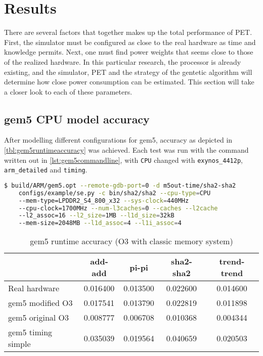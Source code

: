 \section{Results}

There are several factors that together makes up the total performance of PET. First, the simulator must be
configured as close to the real hardware as time and knowledge permits. Next, one must find power weights that
seems close to those of the realized hardware. In this particular research, the processor is already existing,
and the simulator, PET and the strategy of the gentetic algorithm will determine how close power consumption
can be estimated. This section will take a closer look to each of these parameters.

\subsection{gem5 CPU model accuracy}

After modelling different configurations for gem5, accuracy as depicted in \autoref{tbl:gem5runtimeaccuracy}
was achieved. Each test was run with the command written out in \autoref{lst:gem5commandline}, with \texttt{CPU}
changed with  \texttt{exynos\_4412p}, \texttt{arm\_detailed} and \texttt{timing}.

\begin{lstlisting}[language=sh,label={lst:gem5commandline},caption={gem5 Command Line}]
$ build/ARM/gem5.opt --remote-gdb-port=0 -d m5out-time/sha2-sha2
    configs/example/se.py -c bin/sha2/sha2 --cpu-type=CPU
    --mem-type=LPDDR2_S4_800_x32 --sys-clock=440MHz
    --cpu-clock=1700MHz --num-l3caches=0 --caches --l2cache
    --l2_assoc=16 --l2_size=1MB --l1d_size=32kB
    --mem-size=2048MB --l1d_assoc=4 --l1i_assoc=4
\end{lstlisting}


\begin{table}
\centering
\begin{tabular}{|l|c|c|c|c|}
\hline
 & add-add & pi-pi & sha2-sha2 & trend-trend \\
\hline
Real hardware & 0.016400  & 0.013500 & 0.022600 & 0.014600 \\
gem5 modified O3    & 0.017541 & 0.013790 & 0.022819 & 0.011898 \\
gem5 original O3    & 0.008777 & 0.006708 & 0.010368 & 0.004344 \\
gem5 timing simple  & 0.035039 & 0.019564 & 0.040659 & 0.020503 \\
\hline
\end{tabular}
\caption{gem5 runtime accuracy (O3 with classic memory system)}
\label{tbl:gem5runtimeaccuracy}
\end{table}




